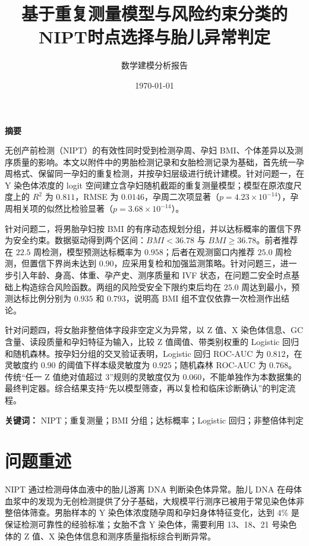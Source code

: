 \documentclass[UTF8,a4paper,12pt]{ctexart}
\title{基于重复测量模型与风险约束分类的\quad NIPT时点选择与胎儿异常判定}
\author{数学建模分析报告}
\date{\today}
\begin{document}
\maketitle
\begin{center}
\textbf{摘要}
\end{center}

无创产前检测（NIPT）的有效性同时受到检测孕周、孕妇 BMI、个体差异以及测序质量的影响。本文以附件中的男胎检测记录和女胎检测记录为基础，首先统一孕周格式、保留同一孕妇的重复检测，并按孕妇层级进行统计建模。针对问题一，在 Y 染色体浓度的 logit 空间建立含孕妇随机截距的重复测量模型；模型在原浓度尺度上的 $R^2$ 为 $0.811$，RMSE 为 $0.0146$，孕周二次项显著（$p=4.23\times 10^{-14}$），孕周相关项的似然比检验显著（$p=3.68\times10^{-14}$）。

针对问题二，将男胎孕妇按 BMI 的有序动态规划分组，并以达标概率的置信下界为安全约束。数据驱动得到两个区间：$BMI<36.78$ 与 $BMI\ge36.78$。前者推荐在 $22.5$ 周检测，模型预测达标概率为 $0.958$；后者在观测窗口内推荐 $25.0$ 周检测，但置信下界尚未达到 $0.90$，应采用复检和加强监测策略。针对问题三，进一步引入年龄、身高、体重、孕产史、测序质量和 IVF 状态，在问题二安全时点基础上构造综合风险函数。两组的风险受安全下限约束后均在 $25.0$ 周达到最小，预测达标比例分别为 $0.935$ 和 $0.793$，说明高 BMI 组不宜仅依靠一次检测作出结论。

针对问题四，将女胎非整倍体字段非空定义为异常，以 Z 值、X 染色体信息、GC 含量、读段质量和孕妇特征为输入，比较 Z 值阈值、带类别权重的 Logistic 回归和随机森林。按孕妇分组的交叉验证表明，Logistic 回归 ROC-AUC 为 $0.812$，在灵敏度约 $0.90$ 的阈值下样本级灵敏度为 $0.925$；随机森林 ROC-AUC 为 $0.768$。传统“任一 Z 值绝对值超过 3”规则的灵敏度仅为 $0.060$，不能单独作为本数据集的最终判定器。综合结果支持“先以模型筛查，再以复检和临床诊断确认”的判定流程。

\noindent\textbf{关键词：} NIPT；重复测量；BMI 分组；达标概率；Logistic 回归；非整倍体判定

\section{问题重述}

NIPT 通过检测母体血液中的胎儿游离 DNA 判断染色体异常。胎儿 DNA 在母体血浆中的发现为无创检测提供了分子基础\cite{Lo1997}，大规模平行测序已被用于常见染色体非整倍体筛查\cite{Chiu2011,Bianchi2014}。男胎样本的 Y 染色体浓度随孕周和孕妇身体特征变化，达到 $4\%$ 是保证检测可靠性的经验标准；女胎不含 Y 染色体，需要利用 13、18、21 号染色体的 Z 值、X 染色体信息和测序质量指标综合判断异常。
\end{document}

